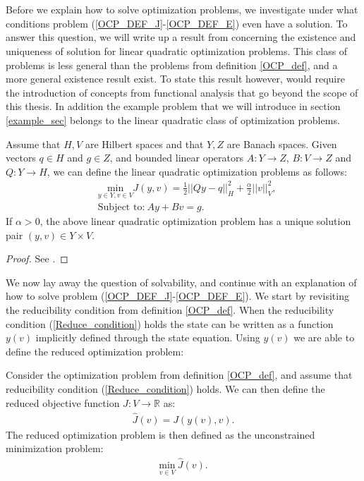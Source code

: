 \\
\\
Before we explain how to solve optimization problems, we investigate under what conditions problem (\ref{OCP_DEF_J}-\ref{OCP_DEF_E}) even have a solution. To answer this question, we will write up a result from \cite{hinze2008optimization} concerning the existence and uniqueness of solution for linear quadratic optimization problems. This class of problems is less general than the problems from definition \ref{OCP_def}, and a more general existence result exist. To state this result however, would require the introduction of concepts from functional analysis that go beyond the scope of this thesis. In addition the example problem that we will introduce in section \ref{example_sec} belongs to the linear quadratic class of optimization problems. 
\begin{theorem} \label{existence}
Assume that $H,V$ are Hilbert spaces and that $Y,Z$ are Banach spaces. Given vectors $q\in H$ and $g\in Z$, and bounded linear operators $A:Y\rightarrow Z$, $B:V\rightarrow Z$ and $Q:Y\rightarrow H$, we can define the linear quadratic optimization problems as follows:
\begin{align*}
&\underset{y\in Y,v\in V}{\text{min}}J(y,v) = \frac{1}{2}||Qy-q||_H^2 + \frac{\alpha}{2}||v||_V^2, \\
&\textrm{Subject to:} \ Ay + Bv = g.
\end{align*}
If $\alpha>0$, the above linear quadratic optimization problem has a unique solution pair $(y,v)\in Y\times V$.
\end{theorem}   
\begin{proof}
See \cite{hinze2008optimization}.
\end{proof}
\noindent
We now lay away the question of solvability, and continue with an explanation of how to solve problem (\ref{OCP_DEF_J}-\ref{OCP_DEF_E}). We start by revisiting the reducibility condition from definition \ref{OCP_def}. When the reducibility condition (\ref{Reduce_condition}) holds the state can be written as a function $y(v)$ implicitly defined through the state equation. Using $y(v)$ we are able to define the reduced optimization problem:
\begin{definition} \label{DEF_RED_OCP}
Consider the optimization problem from definition \ref{OCP_def}, and assume that reducibility condition (\ref{Reduce_condition}) holds. We can then define the reduced objective function $\hat J:V\rightarrow\mathbb{R}$ as:
\begin{align}
\hat J(v) = J(y(v),v). \label{ROF}
\end{align}
The reduced optimization problem is then defined as the unconstrained minimization problem:
\begin{align}
\underset{v\in V}{\text{min}} \ \hat J(v). \label{reduced problem}
\end{align}
\end{definition} 
